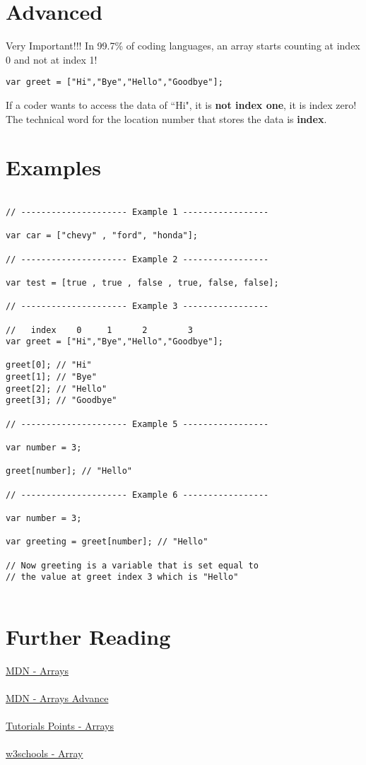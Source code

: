 \documentclass[12pt, letterpaper]{article}
\begin{document}
\section*{Advanced}

Very Important!!! In 99.7\% of coding languages, an array starts counting at index 0 and not at index 1!
\begin{lstlisting}
var greet = ["Hi","Bye","Hello","Goodbye"];
\end{lstlisting}
If a coder wants to access the data of ``Hi", it is \textbf{not index one}, it is index zero! The technical word for the location number that stores the data is \textbf{index}.

\section*{Examples}

\begin{lstlisting}

// --------------------- Example 1 -----------------

var car = ["chevy" , "ford", "honda"];

// --------------------- Example 2 -----------------

var test = [true , true , false , true, false, false];

// --------------------- Example 3 -----------------

//   index    0     1      2        3
var greet = ["Hi","Bye","Hello","Goodbye"];

greet[0]; // "Hi"
greet[1]; // "Bye"
greet[2]; // "Hello"
greet[3]; // "Goodbye"

// --------------------- Example 5 -----------------

var number = 3;

greet[number]; // "Hello"

// --------------------- Example 6 -----------------

var number = 3;

var greeting = greet[number]; // "Hello"

// Now greeting is a variable that is set equal to 
// the value at greet index 3 which is "Hello"


\end{lstlisting}

\section*{Further Reading}

\href{https://developer.mozilla.org/en-US/docs/Glossary/array}{MDN - Arrays}\\
\\
\href{https://developer.mozilla.org/en-US/docs/Learn/JavaScript/First_steps/Arrays}{MDN - Arrays Advance}\\
\\
\href{https://www.tutorialspoint.com/javascript/javascript_arrays_object.htm}{Tutorials Points - Arrays}\\
\\
\href{http://www.w3schools.com/js/js_arrays.asp}{w3schools - Array}
\end{document}
